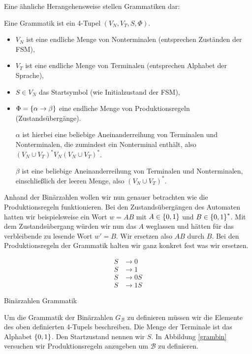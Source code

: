Eine ähnliche Herangehensweise stellen Grammatiken dar:
\begin{defn}[Grammatik]
Eine Grammatik ist ein 4-Tupel $(V_N, V_T, S, \Phi)$.
\begin{itemize}
\item $V_N$ ist eine endliche Menge von Nonterminalen (entsprechen Zuständen der FSM),
\item $V_T$ ist eine endliche Menge von Terminalen (entsprechen Alphabet der Sprache),
\item $S \in V_N$ das Startsymbol (wie Initialzustand der FSM),
\item $\Phi=\left\{\alpha \to \beta\right\}$ eine endliche Menge von Produktionsregeln (Zustandsübergänge).

$\alpha$ ist hierbei eine beliebige Aneinanderreihung von Terminalen und Nonterminalen, die zumindest ein Nonterminal enthält,
also $(V_N \cup V_T)^* V_N (V_N \cup V_T)^*$.

$\beta$ ist eine beliebige Aneinanderreihung von Terminalen und Nonterminalen, einschließlich der leeren Menge,
also $(V_N \cup V_T)^*$.
\end{itemize}
\end{defn}

Anhand der Binärzahlen wollen wir nun genauer betrachten wie die Produktionsregeln funktionieren.
Bei den Zustandsübergängen des Automaten hatten wir beispielsweise ein Wort $w=AB$ mit $A \in \left\{0,1\right\}$ und $B \in \left\{0,1\right\}^*$.
Mit dem Zustandsübergang würden wir nun das $A$ weglassen und hätten für das verbleibende zu lesende Wort $w'=B$.
Wir ersetzen also $AB$ durch $B$. Bei den Produktionsregeln der Grammatik halten wir ganz konkret fest was wir ersetzen.

\begin{floatingfigure}[r]{6.5cm}
\begin{align*}
S &\to 0 \\
S &\to 1 \\
S &\to 0S \\
S &\to 1S
\end{align*}
 \caption{Binärzahlen Grammatik}
  \vspace{0.3cm}
 \label{grambin}
\end{floatingfigure}

Um die Grammatik der Binärzahlen $G_{\mathcal{B}}$ zu definieren müssen wir die Elemente des oben definierten 4-Tupels beschreiben.
Die Menge der Terminale ist das Alphabet $\left\{0,1\right\}$.
Den Startzustand nennen wir $S$. In Abbildung \ref{grambin} versuchen wir Produktionsregeln anzugeben um $\mathcal{B}$ zu definieren.

